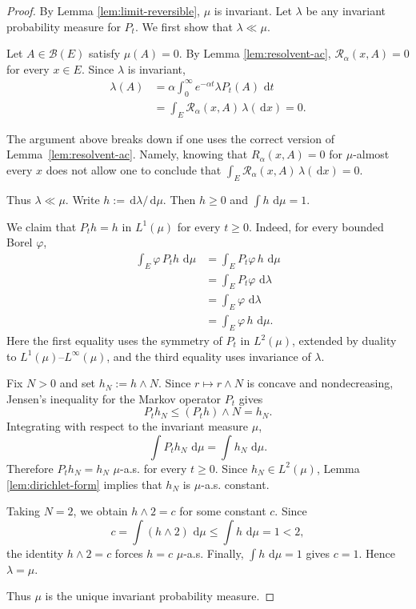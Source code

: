 \documentclass[12pt]{article}
\numberwithin{equation}{section}
\newcommand{\dd}{\,\mathrm d}
\newcommand{\1}{\mathbf 1}
\newcommand{\cB}{\mathcal B}
\newcommand{\review}[1]{\begin{reviewbox}#1\end{reviewbox}}
\begin{document}
\begin{proof}
By Lemma \ref{lem:limit-reversible}, $\mu$ is invariant. Let $\lambda$ be any
invariant probability measure for $P_t$. We first show that $\lambda\ll\mu$.

Let $A\in\cB(E)$ satisfy $\mu(A)=0$. By Lemma \ref{lem:resolvent-ac},
$\mathcal R_\alpha(x,A)=0$ for every $x\in E$. Since $\lambda$ is invariant,
\[
\begin{aligned}
        \lambda(A)
        &=
        \alpha\int_0^\infty e^{-\alpha t}\lambda P_t(A)\,\dd t        \\
        &=
        \int_E \mathcal R_\alpha(x,A)\,\lambda(\dd x)
        =0.
\end{aligned}
\] 
\review{The argument above breaks down if one uses the correct version of Lemma~\ref{lem:resolvent-ac}. Namely, knowing that $R_\alpha(x,A) = 0$ for $\mu$-almost every $x$ does not allow one to conclude that 
$  \int_E \mathcal R_\alpha(x,A)\,\lambda(\dd x)
        =0.$
}
Thus $\lambda\ll\mu$. Write $h:=\dd\lambda/\dd\mu$. Then $h\geq0$ and
$\int h\,\dd\mu=1$.

We claim that $P_t h=h$ in $L^1(\mu)$ for every $t\geq0$. Indeed, for every bounded
Borel $\varphi$,
\[
\begin{aligned}
        \int_E \varphi\,P_t h\,\dd\mu
        &=
        \int_E P_t\varphi\, h\,\dd\mu                         \\
        &=
        \int_E P_t\varphi\,\dd\lambda                         \\
        &=
        \int_E \varphi\,\dd\lambda                            \\
        &=
        \int_E \varphi\,h\,\dd\mu .
\end{aligned}
\]
Here the first equality uses the symmetry of $P_t$ in $L^2(\mu)$, extended by
duality to $L^1(\mu)$--$L^\infty(\mu)$, and the third equality uses invariance of
$\lambda$.

Fix $N>0$ and set $h_N:=h\wedge N$. Since $r\mapsto r\wedge N$ is concave and
nondecreasing, Jensen's inequality for the Markov operator $P_t$ gives
\[
        P_t h_N \leq (P_t h)\wedge N=h_N.
\]
Integrating with respect to the invariant measure $\mu$,
\[
        \int P_t h_N\,\dd\mu=\int h_N\,\dd\mu.
\]
Therefore $P_t h_N=h_N$ $\mu$-a.s. for every $t\geq0$. Since $h_N\in L^2(\mu)$,
Lemma \ref{lem:dirichlet-form} implies that $h_N$ is $\mu$-a.s. constant.

Taking $N=2$, we obtain $h\wedge2=c$ for some constant $c$. Since
\[
        c=\int (h\wedge2)\,\dd\mu\leq \int h\,\dd\mu=1<2,
\]
the identity $h\wedge2=c$ forces $h=c$ $\mu$-a.s. Finally,
$\int h\,\dd\mu=1$ gives $c=1$. Hence $\lambda=\mu$.

Thus $\mu$ is the unique invariant probability measure.
\end{proof}
\end{document}
